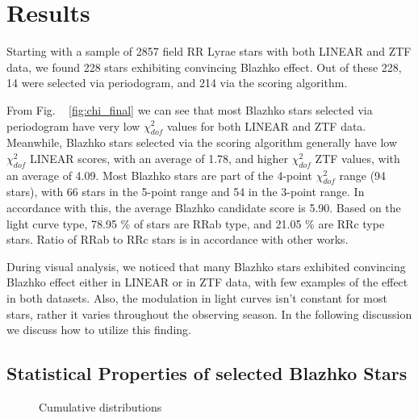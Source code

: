 

\section{Results}\label{sec:results}

Starting with a sample of 2857 field RR Lyrae stars with both LINEAR and ZTF data, we found 228 stars exhibiting
convincing Blazhko effect. Out of these 228, 14 were selected via periodogram, and 214 via the scoring algorithm. 

From Fig. ~ \ref{fig:chi_final} we can see that most Blazhko stars selected via periodogram have very low $\chi^2_{dof}$ values for both 
LINEAR and ZTF data. Meanwhile, Blazhko stars selected via the scoring algorithm generally have low $\chi^2_{dof}$ LINEAR scores, with an average of 1.78, and higher $\chi^2_{dof}$ ZTF values,
with an average of 4.09. Most Blazhko stars are part of the 4-point $\chi^2_{dof}$ range (94 stars), with 66 stars in the 5-point range and 54 in the 3-point range. In accordance with this, the
average Blazhko candidate score is 5.90. Based on the light curve type, 78.95 \% of stars are RRab type, and 21.05 \% are RRc type stars. Ratio of RRab to RRc stars is in accordance with other works.

During visual analysis, we noticed that many Blazhko stars exhibited convincing Blazhko effect either in LINEAR or in ZTF data, with few examples of the effect in both datasets. 
Also, the modulation in light curves isn't constant for most stars, rather it varies throughout the observing season. In the following discussion we discuss how to utilize this finding.


\subsection{Statistical Properties of selected Blazhko Stars}



\begin{figure}[ht]
    \centering
   \caption{Cumulative distributions}
      \label{fig:AmplPeriod}
\end{figure}





